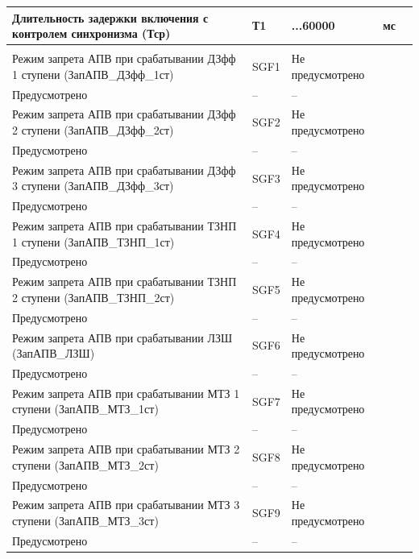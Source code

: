 \begin{longtable}{|>{\centering\arraybackslash}m{5.3cm}|>{\centering\arraybackslash}m{3.3cm}|>{\centering\arraybackslash}m{4.2cm}|>{\centering\arraybackslash}m{1.8cm}|>{\centering\arraybackslash}m{1cm}|}
\hline
\centering Длительность задержки включения с контролем синхронизма (Тср)  & \centering Т1 & \centering 50...60000 & \centering мс & \centering \arraybackslash 10 \\
\hline
\multicolumn{5}{|c|}{ ЗАПВ } \\ \hline 
\centering Режим запрета АПВ при срабатывании ДЗфф 1 ступени (ЗапАПВ\_ДЗфф\_1ст)  & \centering SGF1 & \centering Не предусмотрено \\ Предусмотрено & \centering -- & \centering \arraybackslash -- \\
\hline
\centering Режим запрета АПВ при срабатывании ДЗфф 2 ступени (ЗапАПВ\_ДЗфф\_2ст)  & \centering SGF2 & \centering Не предусмотрено \\ Предусмотрено & \centering -- & \centering \arraybackslash -- \\
\hline
\centering Режим запрета АПВ при срабатывании ДЗфф 3 ступени (ЗапАПВ\_ДЗфф\_3ст)  & \centering SGF3 & \centering Не предусмотрено \\ Предусмотрено & \centering -- & \centering \arraybackslash -- \\
\hline
\centering Режим запрета АПВ при срабатывании ТЗНП 1 ступени (ЗапАПВ\_ТЗНП\_1ст)  & \centering SGF4 & \centering Не предусмотрено \\ Предусмотрено & \centering -- & \centering \arraybackslash -- \\
\hline
\centering Режим запрета АПВ при срабатывании ТЗНП 2 ступени (ЗапАПВ\_ТЗНП\_2ст)  & \centering SGF5 & \centering Не предусмотрено \\ Предусмотрено & \centering -- & \centering \arraybackslash -- \\
\hline
\centering Режим запрета АПВ при срабатывании ЛЗШ (ЗапАПВ\_ЛЗШ)  & \centering SGF6 & \centering Не предусмотрено \\ Предусмотрено & \centering -- & \centering \arraybackslash -- \\
\hline
\centering Режим запрета АПВ при срабатывании МТЗ 1 ступени (ЗапАПВ\_МТЗ\_1ст)  & \centering SGF7 & \centering Не предусмотрено \\ Предусмотрено & \centering -- & \centering \arraybackslash -- \\
\hline
\centering Режим запрета АПВ при срабатывании МТЗ 2 ступени (ЗапАПВ\_МТЗ\_2ст)  & \centering SGF8 & \centering Не предусмотрено \\ Предусмотрено & \centering -- & \centering \arraybackslash -- \\
\hline
\centering Режим запрета АПВ при срабатывании МТЗ 3 ступени (ЗапАПВ\_МТЗ\_3ст)  & \centering SGF9 & \centering Не предусмотрено \\ Предусмотрено & \centering -- & \centering \arraybackslash -- \\

\end{longtable}
